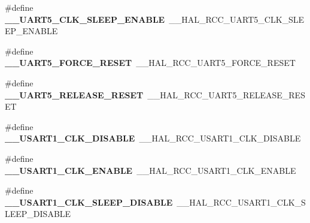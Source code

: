 \begin{DoxyCompactItemize}
\item 
\#define {\bfseries \+\_\+\+\_\+\+U\+A\+R\+T5\+\_\+\+C\+L\+K\+\_\+\+S\+L\+E\+E\+P\+\_\+\+E\+N\+A\+B\+LE}~\+\_\+\+\_\+\+H\+A\+L\+\_\+\+R\+C\+C\+\_\+\+U\+A\+R\+T5\+\_\+\+C\+L\+K\+\_\+\+S\+L\+E\+E\+P\+\_\+\+E\+N\+A\+B\+LE\hypertarget{group___h_a_l___r_c_c___aliased_ga4a91f9d4af6a747b6e37e343101c4757}{}\label{group___h_a_l___r_c_c___aliased_ga4a91f9d4af6a747b6e37e343101c4757}

\item 
\#define {\bfseries \+\_\+\+\_\+\+U\+A\+R\+T5\+\_\+\+F\+O\+R\+C\+E\+\_\+\+R\+E\+S\+ET}~\+\_\+\+\_\+\+H\+A\+L\+\_\+\+R\+C\+C\+\_\+\+U\+A\+R\+T5\+\_\+\+F\+O\+R\+C\+E\+\_\+\+R\+E\+S\+ET\hypertarget{group___h_a_l___r_c_c___aliased_gaa862c1dd316cef6f49cf1d8b75fc98ab}{}\label{group___h_a_l___r_c_c___aliased_gaa862c1dd316cef6f49cf1d8b75fc98ab}

\item 
\#define {\bfseries \+\_\+\+\_\+\+U\+A\+R\+T5\+\_\+\+R\+E\+L\+E\+A\+S\+E\+\_\+\+R\+E\+S\+ET}~\+\_\+\+\_\+\+H\+A\+L\+\_\+\+R\+C\+C\+\_\+\+U\+A\+R\+T5\+\_\+\+R\+E\+L\+E\+A\+S\+E\+\_\+\+R\+E\+S\+ET\hypertarget{group___h_a_l___r_c_c___aliased_gac1d6aac067f40a8881b272393db61725}{}\label{group___h_a_l___r_c_c___aliased_gac1d6aac067f40a8881b272393db61725}

\item 
\#define {\bfseries \+\_\+\+\_\+\+U\+S\+A\+R\+T1\+\_\+\+C\+L\+K\+\_\+\+D\+I\+S\+A\+B\+LE}~\+\_\+\+\_\+\+H\+A\+L\+\_\+\+R\+C\+C\+\_\+\+U\+S\+A\+R\+T1\+\_\+\+C\+L\+K\+\_\+\+D\+I\+S\+A\+B\+LE\hypertarget{group___h_a_l___r_c_c___aliased_gaa5da6139eb7a5c1432f3bbdb29021f03}{}\label{group___h_a_l___r_c_c___aliased_gaa5da6139eb7a5c1432f3bbdb29021f03}

\item 
\#define {\bfseries \+\_\+\+\_\+\+U\+S\+A\+R\+T1\+\_\+\+C\+L\+K\+\_\+\+E\+N\+A\+B\+LE}~\+\_\+\+\_\+\+H\+A\+L\+\_\+\+R\+C\+C\+\_\+\+U\+S\+A\+R\+T1\+\_\+\+C\+L\+K\+\_\+\+E\+N\+A\+B\+LE\hypertarget{group___h_a_l___r_c_c___aliased_gae10e7a83f9766bc578dbc39727751fa8}{}\label{group___h_a_l___r_c_c___aliased_gae10e7a83f9766bc578dbc39727751fa8}

\item 
\#define {\bfseries \+\_\+\+\_\+\+U\+S\+A\+R\+T1\+\_\+\+C\+L\+K\+\_\+\+S\+L\+E\+E\+P\+\_\+\+D\+I\+S\+A\+B\+LE}~\+\_\+\+\_\+\+H\+A\+L\+\_\+\+R\+C\+C\+\_\+\+U\+S\+A\+R\+T1\+\_\+\+C\+L\+K\+\_\+\+S\+L\+E\+E\+P\+\_\+\+D\+I\+S\+A\+B\+LE\hypertarget{group___h_a_l___r_c_c___aliased_gaa4dced1323153e27e9c29faebee35ddb}{}\label{group___h_a_l___r_c_c___aliased_gaa4dced1323153e27e9c29faebee35ddb}


\end{DoxyCompactItemize}
